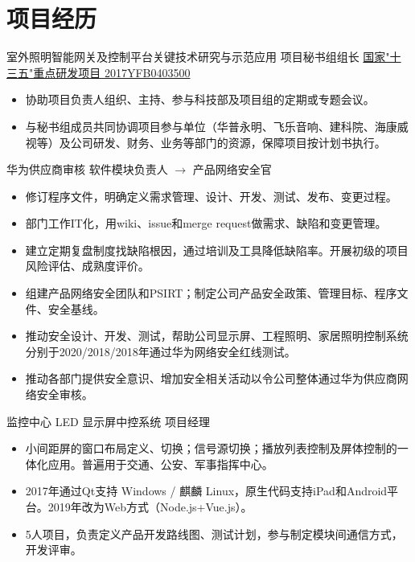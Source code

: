 \documentclass[10pt,a4paper]{moderncv}
\begin{document}

\section{项目经历}

{室外照明智能网关及控制平台关键技术研究与示范应用}
{项目秘书组组长}
{\href{http://service.most.gov.cn/u/cms/static/201706/05145323ywhn.pdf}{国家"十三五"重点研发项目 2017YFB0403500}}{}
{
\begin{itemize}
	\item 协助项目负责人组织、主持、参与科技部及项目组的定期或专题会议。
	\item 与秘书组成员共同协调项目参与单位（华普永明、飞乐音响、建科院、海康威视等）及公司研发、财务、业务等部门的资源，保障项目按计划书执行。
\end{itemize}
}

{华为供应商审核}
{软件模块负责人 $\rightarrow$ 产品网络安全官}
{}{}
{
\begin{itemize}
	\item 修订程序文件，明确定义需求管理、设计、开发、测试、发布、变更过程。
	\item 部门工作IT化，用wiki、issue和merge request做需求、缺陷和变更管理。
	\item 建立定期复盘制度找缺陷根因，通过培训及工具降低缺陷率。开展初级的项目风险评估、成熟度评价。
	\item 组建产品网络安全团队和PSIRT；制定公司产品安全政策、管理目标、程序文件、安全基线。
	\item 推动安全设计、开发、测试，帮助公司显示屏、工程照明、家居照明控制系统分别于2020/2018/2018年通过华为网络安全红线测试。
	\item 推动各部门提供安全意识、增加安全相关活动以令公司整体通过华为供应商网络安全审核。
\end{itemize}
}

{监控中心 LED 显示屏中控系统}
{项目经理}
{}{}
{
\begin{itemize}
	\item 小间距屏的窗口布局定义、切换；信号源切换；播放列表控制及屏体控制的一体化应用。普遍用于交通、公安、军事指挥中心。
	\item 2017年通过Qt支持 Windows / 麒麟 Linux，原生代码支持iPad和Android平台。2019年改为Web方式（Node.js+Vue.js）。
	\item 5人项目，负责定义产品开发路线图、测试计划，参与制定模块间通信方式，开发评审。
\end{itemize}
}
\end{document}
